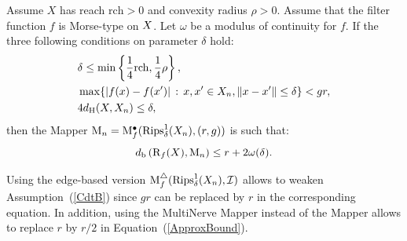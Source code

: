 \begin{thm}\label{thm:geomineq}
Assume $X$ has reach $\mathrm{rch}>0$ and convexity radius $\rho>0$. 
Assume that the filter function $f$ is Morse-type on $X$. 
Let $\omega$ be a modulus of continuity for $f$.
If the three following conditions on parameter $\delta$ hold:
\begin{align}
&\delta \leq  \min\left\{\frac 1 4\mathrm{rch}, \frac 1 4 \rho\right\}, \label{CdtA} \\
&\max\{|f(x)-f(x')|\, :\, x,x'\in X_n, \|x-x'\|\leq \delta\}    <  g r, \label{CdtB} \\ 
&4  d_{\rm H}(X ,X_n) \leq\delta ,  \label{CdtD}
\end{align}
then the Mapper $\mathrm{M}_n = \mathrm{M}^\bullet_f(\mathrm{Rips}_\delta^1(X_n),(r,g))$ %
is such that:
\begin{equation} \label{ApproxBound}
d_{\rm b}\left(\mathrm{R}_f(X), \mathrm{M}_n \right)\leq r +2\omega(\delta).
\end{equation}
\end{thm}


\begin{rmq} \label{rq:metrics}
Using the edge-based version $\mathrm{M}^\triangle_f(\mathrm{Rips}_\delta^1(X_n),\mathcal{I})$ %
allows to weaken Assumption~(\ref{CdtB}) since $gr$ can be replaced by $r$ in the corresponding equation.
In addition, using the MultiNerve Mapper instead of the Mapper allows to replace $r$ by $r/2$ in Equation~(\ref{ApproxBound}).
\end{rmq}


